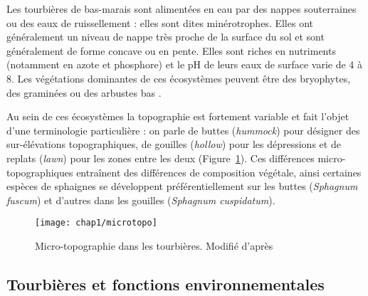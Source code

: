 Les tourbières de bas-marais sont alimentées en eau par des nappes souterraines ou des eaux de ruissellement : elles sont dites minérotrophes.
Elles ont généralement un niveau de nappe très proche de la surface du sol et sont généralement de forme concave ou en pente.
Elles sont riches en nutriments (notamment en azote et phosphore) et le pH de leurs eaux de surface varie de 4 à 8.
Les végétations dominantes de ces écosystèmes peuvent être des bryophytes, des graminées ou des arbustes bas \citep{rydin2013a}.

Au sein de ces écosystèmes la topographie est fortement variable et fait l'objet d'une terminologie particulière : on parle de buttes (\textit{hummock}) pour désigner des sur-élévations topographiques, de gouilles (\textit{hollow}) pour les dépressions et de replats (\textit{lawn}) pour les zones entre les deux (Figure~\ref{fig:microtopo}).
Ces différences micro-topographiques entraînent des différences de composition végétale, ainsi certaines espèces de sphaignes se développent préférentiellement sur les buttes (\textit{Sphagnum fuscum}) et d'autres dans les gouilles (\textit{Sphagnum cuspidatum}).


\begin{figure}[t]
\centering
\texttt{[image: chap1/microtopo]}
\caption{Micro-topographie dans les tourbières. Modifié d'après \citet{rydin2013a}}
\label{fig:microtopo}
\end{figure}

\subsection{Tourbières et fonctions environnementales}

